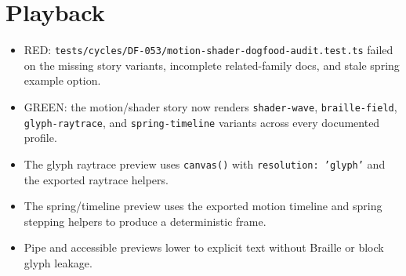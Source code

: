 \section{Playback}\label{record-098-playback}

\begin{itemize}
\tightlist
\item
  RED: \texttt{t\allowbreak{}e\allowbreak{}s\allowbreak{}t\allowbreak{}s\allowbreak{}/\allowbreak{}c\allowbreak{}y\allowbreak{}c\allowbreak{}l\allowbreak{}e\allowbreak{}s\allowbreak{}/\allowbreak{}D\allowbreak{}F\allowbreak{}-\allowbreak{}0\allowbreak{}5\allowbreak{}3\allowbreak{}/\allowbreak{}m\allowbreak{}o\allowbreak{}t\allowbreak{}i\allowbreak{}o\allowbreak{}n\allowbreak{}-\allowbreak{}s\allowbreak{}h\allowbreak{}a\allowbreak{}d\allowbreak{}e\allowbreak{}r\allowbreak{}-\allowbreak{}d\allowbreak{}o\allowbreak{}g\allowbreak{}f\allowbreak{}o\allowbreak{}o\allowbreak{}d\allowbreak{}-\allowbreak{}a\allowbreak{}u\allowbreak{}d\allowbreak{}i\allowbreak{}t\allowbreak{}.\allowbreak{}t\allowbreak{}e\allowbreak{}s\allowbreak{}t\allowbreak{}.\allowbreak{}t\allowbreak{}s} failed on the missing story variants, incomplete related-family docs, and stale spring example option.
\item
  GREEN: the motion/shader story now renders \texttt{s\allowbreak{}h\allowbreak{}a\allowbreak{}d\allowbreak{}e\allowbreak{}r\allowbreak{}-\allowbreak{}w\allowbreak{}a\allowbreak{}v\allowbreak{}e}, \texttt{b\allowbreak{}r\allowbreak{}a\allowbreak{}i\allowbreak{}l\allowbreak{}l\allowbreak{}e\allowbreak{}-\allowbreak{}f\allowbreak{}i\allowbreak{}e\allowbreak{}l\allowbreak{}d}, \texttt{g\allowbreak{}l\allowbreak{}y\allowbreak{}p\allowbreak{}h\allowbreak{}-\allowbreak{}r\allowbreak{}a\allowbreak{}y\allowbreak{}t\allowbreak{}r\allowbreak{}a\allowbreak{}c\allowbreak{}e}, and \texttt{s\allowbreak{}p\allowbreak{}r\allowbreak{}i\allowbreak{}n\allowbreak{}g\allowbreak{}-\allowbreak{}t\allowbreak{}i\allowbreak{}m\allowbreak{}e\allowbreak{}l\allowbreak{}i\allowbreak{}n\allowbreak{}e} variants across every documented profile.
\item
  The glyph raytrace preview uses \texttt{c\allowbreak{}a\allowbreak{}n\allowbreak{}v\allowbreak{}a\allowbreak{}s\allowbreak{}(\allowbreak{})} with \texttt{r\allowbreak{}e\allowbreak{}s\allowbreak{}o\allowbreak{}l\allowbreak{}u\allowbreak{}t\allowbreak{}i\allowbreak{}o\allowbreak{}n\allowbreak{}:\allowbreak{} \allowbreak{}'\allowbreak{}g\allowbreak{}l\allowbreak{}y\allowbreak{}p\allowbreak{}h\allowbreak{}'} and the exported raytrace helpers.
\item
  The spring/timeline preview uses the exported motion timeline and spring stepping helpers to produce a deterministic frame.
\item
  Pipe and accessible previews lower to explicit text without Braille or block glyph leakage.
\end{itemize}


